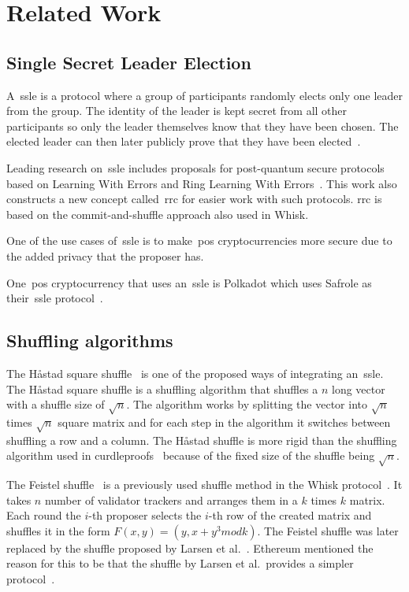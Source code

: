 \section{Related Work}\label{sec:related-work}




\subsection{Single Secret Leader Election}\label{sec:related-work-SSLE}
A~\gls{ssle} is a protocol where a group of participants randomly elects only one leader from the group.
The identity of the leader is kept secret from all other participants so only the leader themselves know that they have been chosen.
The elected leader can then later publicly prove that they have been elected~\cite{10.1145/3419614.3423258}.

Leading research on~\gls{ssle} includes proposals for post-quantum secure protocols based on Learning With Errors and Ring Learning With Errors~\cite{cryptoeprint:2023/1241}.
This work also constructs a new concept called~\gls{rrc} for easier work with such protocols.
\gls{rrc} is based on the commit-and-shuffle approach also used in Whisk.

One of the use cases of~\gls{ssle} is to make~\gls{pos} cryptocurrencies more secure due to the added privacy that the proposer has.

One~\gls{pos} cryptocurrency that uses an~\gls{ssle} is Polkadot which uses Safrole as their~\gls{ssle} protocol~\cite{safrole}.



\subsection{Shuffling algorithms}\label{subsec:related-work-shuffling-algorithm}

The Håstad square shuffle~\cite{haastad2006square} is one of the proposed ways of integrating an~\gls{ssle}.
The Håstad square shuffle is a shuffling algorithm that shuffles a $n$ long vector with a shuffle size of $\sqrt {n}$.
The algorithm works by splitting the vector into $\sqrt {n}$ times $\sqrt {n}$ square matrix and for each step in the algorithm it switches between shuffling a row and a column.
The Håstad shuffle is more rigid than the shuffling algorithm used in curdleproofs~\cite{cryptoeprint:2022/560} because of the fixed size of the shuffle being $\sqrt {n}$.

The Feistel shuffle~\cite{Feistle} is a previously used shuffle method in the Whisk protocol~\cite{Whisk2024}.
It takes $n$ number of validator trackers and arranges them in a $k$ times $k$ matrix.
Each round the $i$-th proposer selects the $i$-th row of the created matrix and shuffles it in the form $F(x,y)=(y,x+y^3 mod k)$.
The Feistel shuffle was later replaced by the shuffle proposed by Larsen et al.~\cite{cryptoeprint:2022/560}.
Ethereum mentioned the reason for this to be that the shuffle by Larsen et al.\ provides a simpler protocol~\cite{Whisk2024}.

